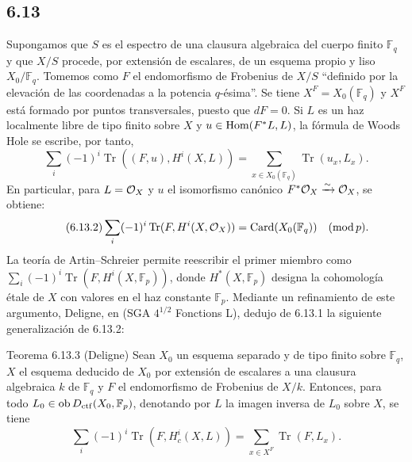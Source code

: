 \subsection*{6.13}
Supongamos que $S$ es el espectro de una clausura algebraica del cuerpo finito $\mathbb F_q$ y que $X/S$ procede, por extensión de escalares, de un esquema propio y liso $X_0/\mathbb F_q$. Tomemos como $F$ el endomorfismo de Frobenius de $X/S$ ``definido por la elevación de las coordenadas a la potencia $q$-\'esima''. Se tiene $X^F=X_0(\mathbb F_q)$ y $X^F$ está formado por puntos transversales, puesto que $dF=0$. Si $L$ es un haz localmente libre de tipo finito sobre $X$ y $u\in\operatorname{Hom}(F^*L,L)$, la fórmula de Woods Hole se escribe, por tanto,
\begin{equation}
\tag{6.13.1}
\sum_i(-1)^i\operatorname{Tr}((F,u),H^i(X,L))=
\sum_{x\in X_0(\mathbb F_q)}\operatorname{Tr}(u_x,L_x).
\end{equation}
En particular, para $L=\mathcal{O}_X$ y $u$ el isomorfismo canónico $F^*\mathcal{O}_X\xrightarrow{\sim}\mathcal{O}_X$, se obtiene:
\begin{equation}
\tag{6.13.2}
\sum_i(-1)^i\operatorname{Tr}(F,H^i(X,\mathcal{O}_X))=\operatorname{Card}(X_0(\mathbb F_q))\quad(\operatorname{mod} p).
\end{equation}
La teoría de Artin--Schreier permite reescribir el primer miembro como $\sum_i(-1)^i\operatorname{Tr}(F,H^i(X,\mathbb F_p))$, donde $H^*(X,\mathbb F_p)$ designa la cohomología étale de $X$ con valores en el haz constante $\mathbb F_p$. Mediante un refinamiento de este argumento, Deligne, en (SGA $4^{1/2}$ Fonctions L), dedujo de 6.13.1 la siguiente generalización de 6.13.2:


\begin{statement}{Teorema 6.13.3 (Deligne)}
Sean $X_0$ un esquema separado y de tipo finito sobre $\mathbb F_q$, $X$ el esquema deducido de $X_0$ por extensión de escalares a una clausura algebraica $k$ de $\mathbb F_q$ y $F$ el endomorfismo de Frobenius de $X/k$. Entonces, para todo $L_0\in\operatorname{ob} D_{\mathrm{ctf}}(X_0,\mathbb F_p)$, denotando por $L$ la imagen inversa de $L_0$ sobre $X$, se tiene
\[
\sum_i(-1)^i\operatorname{Tr}(F,H_c^i(X,L))=
\sum_{x\in X^F}\operatorname{Tr}(F,L_x).
\]
\end{statement}

